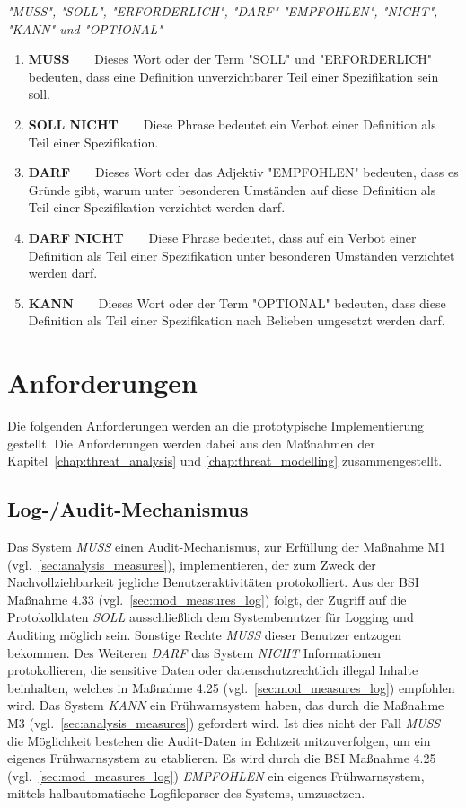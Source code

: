 \documentclass[11pt,a4paper]{report}
\begin{document}
\begin{center}
\textit{"MUSS", "SOLL", "ERFORDERLICH", "DARF" "EMPFOHLEN", "NICHT", "KANN" und "OPTIONAL"}
\end{center} 

\begin{enumerate}
\item \textbf{MUSS}~~~~Dieses Wort oder der Term "SOLL" und "ERFORDERLICH" bedeuten, dass eine  Definition unverzichtbarer Teil einer Spezifikation sein soll.
\item \textbf{SOLL NICHT}~~~~Diese Phrase bedeutet ein Verbot einer Definition als Teil einer Spezifikation.
\item \textbf{DARF}~~~~Dieses Wort oder das Adjektiv "EMPFOHLEN" bedeuten, dass es  Gründe gibt, warum unter besonderen Umständen auf diese Definition als Teil einer Spezifikation verzichtet werden darf. 
\item \textbf{DARF NICHT}~~~~Diese Phrase bedeutet, dass auf ein Verbot einer Definition als Teil einer Spezifikation unter besonderen Umständen verzichtet werden darf.
\item \textbf{KANN}~~~~Dieses Wort oder der Term "OPTIONAL" bedeuten, dass diese Definition als Teil einer Spezifikation nach Belieben umgesetzt werden darf.
\end{enumerate}

\section{Anforderungen}

Die folgenden Anforderungen werden an die prototypische Implementierung gestellt. Die Anforderungen werden dabei aus den Maßnahmen der Kapitel~\ref{chap:threat_analysis} und \ref{chap:threat_modelling} zusammengestellt.

\subsection{Log-/Audit-Mechanismus}

Das System \textit{MUSS} einen Audit-Mechanismus, zur Erfüllung der Maßnahme M1 (vgl.~\ref{sec:analysis_measures}), implementieren, der zum Zweck der Nachvollziehbarkeit jegliche Benutzeraktivitäten protokolliert. Aus der BSI Maßnahme 4.33 (vgl.~\ref{sec:mod_measures_log}) folgt, der Zugriff auf die Protokolldaten \textit{SOLL} ausschließlich dem Systembenutzer für Logging und Auditing möglich sein. Sonstige Rechte \textit{MUSS} dieser Benutzer entzogen bekommen. Des Weiteren \textit{DARF} das System \textit{NICHT} Informationen protokollieren, die sensitive Daten oder datenschutzrechtlich illegal Inhalte beinhalten, welches in Maßnahme 4.25 (vgl.~\ref{sec:mod_measures_log}) empfohlen wird. Das System \textit{KANN} ein Frühwarnsystem haben, das durch die Maßnahme M3 (vgl.~\ref{sec:analysis_measures}) gefordert wird. Ist dies nicht der Fall \textit{MUSS} die Möglichkeit bestehen die Audit-Daten in Echtzeit mitzuverfolgen, um ein eigenes Frühwarnsystem zu etablieren. Es wird durch die BSI Maßnahme 4.25 (vgl.~\ref{sec:mod_measures_log}) \textit{EMPFOHLEN} ein eigenes Frühwarnsystem, mittels halbautomatische Logfileparser des Systems, umzusetzen.
\end{document}
